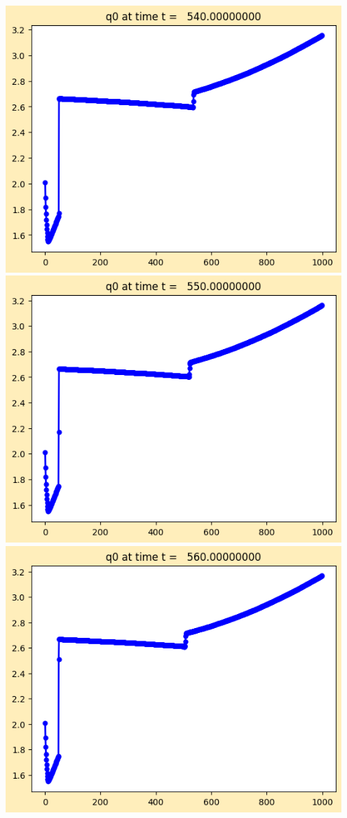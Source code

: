 \documentclass[11pt]{article}
\begin{document}
\vskip 10pt 
\includegraphics[width=0.95\textwidth]{frame0054fig1.png}
\vskip 10pt 
\includegraphics[width=0.95\textwidth]{frame0055fig1.png}
\vskip 10pt 
\includegraphics[width=0.95\textwidth]{frame0056fig1.png}
\end{document}
